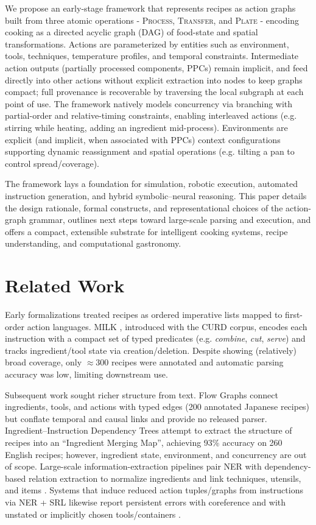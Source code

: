 \documentclass[sigconf]{acmart}
\begin{document}
We propose an early-stage framework that represents recipes as action graphs built from three atomic operations - \textsc{Process}, \textsc{Transfer}, and \textsc{Plate} - encoding cooking as a directed acyclic graph (DAG) of food-state and spatial transformations. Actions are parameterized by entities such as environment, tools, techniques, temperature profiles, and temporal constraints. Intermediate action outputs (partially processed components, PPCs) remain implicit, and feed directly into other actions without explicit extraction into nodes to keep graphs compact; full provenance is recoverable by traversing the local subgraph at each point of use. The framework natively models concurrency via branching with partial-order and relative-timing constraints, enabling interleaved actions (e.g. stirring while heating, adding an ingredient mid-process). Environments are explicit (and implicit, when associated with PPCs) context configurations supporting dynamic reassignment and spatial operations (e.g. tilting a pan to control spread/coverage).

The framework lays a foundation for simulation, robotic execution, automated instruction generation, and hybrid symbolic–neural reasoning. This paper details the design rationale, formal constructs, and representational choices of the action-graph grammar, outlines next steps toward large-scale parsing and execution, and offers a compact, extensible substrate for intelligent cooking systems, recipe understanding, and computational gastronomy.

\section{Related Work}

Early formalizations treated recipes as ordered imperative lists mapped to first-order action languages. MILK \cite{tasse2008sourcream}, introduced with the CURD corpus, encodes each instruction with a compact set of typed predicates (e.g. \textit{combine}, \textit{cut}, \textit{serve}) and tracks ingredient/tool state via creation/deletion. Despite showing (relatively) broad coverage, only $\approx 300$ recipes were annotated and automatic parsing accuracy was low, limiting downstream use.

Subsequent work sought richer structure from text. Flow Graphs \cite{mori2014flow} connect ingredients, tools, and actions with typed edges (200 annotated Japanese recipes) but conflate temporal and causal links and provide no released parser. Ingredient–Instruction Dependency Trees \cite{jermsurawong2015structure} attempt to extract the structure of recipes into an ``Ingredient Merging Map'', achieving 93\% accuracy on 260 English recipes; however, ingredient state, environment, and concurrency are out of scope. Large-scale information-extraction pipelines pair NER with dependency-based relation extraction to normalize ingredients and link techniques, utensils, and items \cite{diwan2020named}. Systems that induce reduced action tuples/graphs from instructions via NER + SRL likewise report persistent errors with coreference and with unstated or implicitly chosen tools/containers \cite{agarwal2011ie}.
\end{document}
